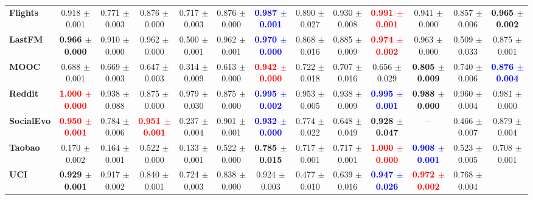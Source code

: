 {\begin{tabular}{lccccc|ccccccc}
\textbf{Flights} 
& 0.918 $\pm$ 0.001 
& 0.771 $\pm$ 0.003 
& 0.876 $\pm$ 0.000 
& 0.717 $\pm$ 0.003 
& 0.876 $\pm$ 0.000 
& \textcolor{blue}{\textbf{0.987 $\pm$ 0.001 }} 
& 0.890 $\pm$ 0.027 
& 0.930 $\pm$ 0.008 
& \textcolor{red}{\textbf{0.991 $\pm$ 0.001 }} 
& 0.941 $\pm$ 0.000 
& 0.857 $\pm$ 0.006 
& \textbf{0.965 $\pm$ 0.002 } \\
\textbf{LastFM} 
& \textbf{0.966 $\pm$ 0.000 } 
& 0.910 $\pm$ 0.000 
& 0.962 $\pm$ 0.000 
& 0.500 $\pm$ 0.001 
& 0.962 $\pm$ 0.001 
& \textcolor{blue}{\textbf{0.970 $\pm$ 0.000 }} 
& 0.868 $\pm$ 0.016 
& 0.885 $\pm$ 0.009 
& \textcolor{red}{\textbf{0.974 $\pm$ 0.002 }} 
& 0.963 $\pm$ 0.000 
& 0.509 $\pm$ 0.033 
& 0.875 $\pm$ 0.001 \\
\textbf{MOOC} 
& 0.688 $\pm$ 0.001 
& 0.669 $\pm$ 0.003 
& 0.647 $\pm$ 0.003 
& 0.314 $\pm$ 0.009 
& 0.613 $\pm$ 0.000 
& \textcolor{red}{\textbf{0.942 $\pm$ 0.000 }} 
& 0.722 $\pm$ 0.018 
& 0.707 $\pm$ 0.016 
& 0.656 $\pm$ 0.029 
& \textbf{0.805 $\pm$ 0.009 } 
& 0.740 $\pm$ 0.006 
& \textcolor{blue}{\textbf{0.876 $\pm$ 0.004 }} \\
\textbf{Reddit} 
& \textcolor{red}{\textbf{1.000 $\pm$ 0.000 }} 
& 0.938 $\pm$ 0.088 
& 0.875 $\pm$ 0.000 
& 0.979 $\pm$ 0.030 
& 0.875 $\pm$ 0.000 
& \textcolor{blue}{\textbf{0.995 $\pm$ 0.002 }} 
& 0.953 $\pm$ 0.005 
& 0.938 $\pm$ 0.009 
& \textcolor{blue}{\textbf{0.995 $\pm$ 0.001 }} 
& \textbf{0.988 $\pm$ 0.000 }
& 0.960 $\pm$ 0.004 
& 0.981 $\pm$ 0.000 \\
\textbf{SocialEvo} 
& \textcolor{red}{\textbf{0.950 $\pm$ 0.001 }}
& 0.784 $\pm$ 0.006 
& \textcolor{red}{\textbf{0.951 $\pm$ 0.001 }}
& 0.237 $\pm$ 0.004 
& 0.901 $\pm$ 0.001 
& \textcolor{blue}{\textbf{0.932 $\pm$ 0.000 }}
& 0.774 $\pm$ 0.022 
& 0.648 $\pm$ 0.049 
& \textbf{0.928 $\pm$ 0.047 }
& -- 
& 0.466 $\pm$ 0.007 
& 0.879 $\pm$ 0.004 \\
\textbf{Taobao} 
& 0.170 $\pm$ 0.002 
& 0.164 $\pm$ 0.001 
& 0.522 $\pm$ 0.000 
& 0.133 $\pm$ 0.001 
& 0.522 $\pm$ 0.000 
& \textbf{0.785 $\pm$ 0.015 }
& 0.717 $\pm$ 0.001 
& 0.717 $\pm$ 0.001 
& \textcolor{red}{\textbf{1.000 $\pm$ 0.000 }} 
& \textcolor{blue}{\textbf{0.908 $\pm$ 0.001 }} 
& 0.523 $\pm$ 0.005 
& 0.708 $\pm$ 0.001 \\
\textbf{UCI} 
& \textbf{0.929 $\pm$ 0.001 } 
& 0.917 $\pm$ 0.002 
& 0.840 $\pm$ 0.001 
& 0.724 $\pm$ 0.003 
& 0.838 $\pm$ 0.000 
& 0.924 $\pm$ 0.003 
& 0.477 $\pm$ 0.010 
& 0.639 $\pm$ 0.016 
& \textcolor{blue}{\textbf{0.947 $\pm$ 0.026 }} 
& \textcolor{red}{\textbf{0.972 $\pm$ 0.002 }} 
& 0.768 $\pm$ 0.004 

\end{tabular}}
